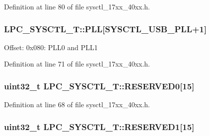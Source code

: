 Definition at line 80 of file sysctl\+\_\+17xx\+\_\+40xx.\+h.

\subsubsection[{\texorpdfstring{P\+LL}{PLL}}]{ L\+P\+C\+\_\+\+S\+Y\+S\+C\+T\+L\+\_\+\+T\+::\+P\+LL\mbox{[}{\bf S\+Y\+S\+C\+T\+L\+\_\+\+U\+S\+B\+\_\+\+P\+LL}+1\mbox{]}}\hypertarget{structLPC__SYSCTL__T_aabc2ad04761cf7c1cbfa8a43ddc91c84}{}\label{structLPC__SYSCTL__T_aabc2ad04761cf7c1cbfa8a43ddc91c84}
Offset\+: 0x080\+: P\+L\+L0 and P\+L\+L1 

Definition at line 71 of file sysctl\+\_\+17xx\+\_\+40xx.\+h.

\subsubsection[{\texorpdfstring{R\+E\+S\+E\+R\+V\+E\+D0}{RESERVED0}}]{\setlength{\rightskip}{0pt plus 5cm}uint32\+\_\+t L\+P\+C\+\_\+\+S\+Y\+S\+C\+T\+L\+\_\+\+T\+::\+R\+E\+S\+E\+R\+V\+E\+D0\mbox{[}15\mbox{]}}\hypertarget{structLPC__SYSCTL__T_aba8b07e1d5fe15516928f19d739f700e}{}\label{structLPC__SYSCTL__T_aba8b07e1d5fe15516928f19d739f700e}


Definition at line 68 of file sysctl\+\_\+17xx\+\_\+40xx.\+h.

\subsubsection[{\texorpdfstring{R\+E\+S\+E\+R\+V\+E\+D1}{RESERVED1}}]{\setlength{\rightskip}{0pt plus 5cm}uint32\+\_\+t L\+P\+C\+\_\+\+S\+Y\+S\+C\+T\+L\+\_\+\+T\+::\+R\+E\+S\+E\+R\+V\+E\+D1\mbox{[}15\mbox{]}}\hypertarget{structLPC__SYSCTL__T_a794708954b13d73772d88570372b7e31}{}\label{structLPC__SYSCTL__T_a794708954b13d73772d88570372b7e31}


